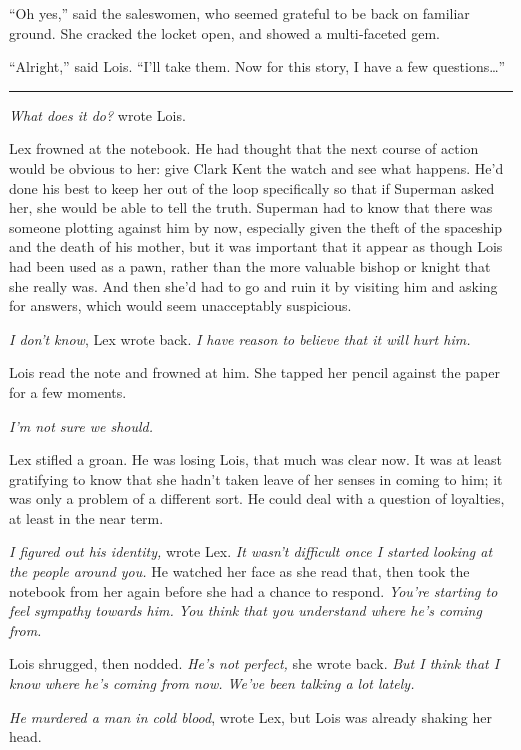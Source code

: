``Oh yes,'' said the saleswomen, who seemed grateful to be back on
familiar ground. She cracked the locket open, and showed a multi‐faceted
gem.

``Alright,'' said Lois. ``I'll take them. Now for this story, I have a
few questions\ldots{}''

\begin{center}\rule{0.5\linewidth}{0.5pt}\end{center}

\emph{What does it do?} wrote Lois.

Lex frowned at the notebook. He had thought that the next course of
action would be obvious to her: give Clark Kent the watch and see what
happens. He'd done his best to keep her out of the loop specifically so
that if Superman asked her, she would be able to tell the truth.
Superman had to know that there was someone plotting against him by now,
especially given the theft of the spaceship and the death of his mother,
but it was important that it appear as though Lois had been used as a
pawn, rather than the more valuable bishop or knight that she really
was. And then she'd had to go and ruin it by visiting him and asking for
answers, which would seem unacceptably suspicious.

\emph{I don't know}, Lex wrote back. \emph{I have reason to believe that
it will hurt him.}

Lois read the note and frowned at him. She tapped her pencil against the
paper for a few moments.

\emph{I'm not sure we should.}

Lex stifled a groan. He was losing Lois, that much was clear now. It was
at least gratifying to know that she hadn't taken leave of her senses in
coming to him; it was only a problem of a different sort. He could deal
with a question of loyalties, at least in the near term.

\emph{I figured out his identity,} wrote Lex. \emph{It wasn't difficult
once I started looking at the people around you.} He watched her face as
she read that, then took the notebook from her again before she had a
chance to respond. \emph{You're starting to feel sympathy towards him.
You think that you understand where he's coming from.}

Lois shrugged, then nodded. \emph{He's not perfect,} she wrote back.
\emph{But I think that I know where he's coming from now. We've been
talking a lot lately.}

\emph{He murdered a man in cold blood}, wrote Lex, but Lois was already
shaking her head.

